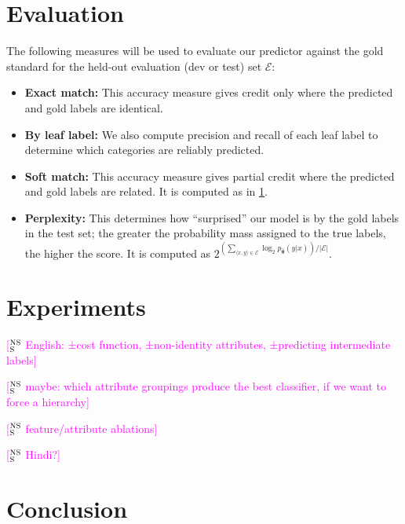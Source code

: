 \documentclass[11pt,letterpaper]{article}
\newcommand{\ensuretext}[1]{#1}
\newcommand{\nssmarker}{\ensuretext{\textcolor{magenta}{\ensuremath{^{\textsc{NS}}_{\textsc{S}}}}}}
\newcommand{\arkcomment}[3]{\ensuretext{\textcolor{#3}{[#1 #2]}}}
\newcommand{\nss}[1]{\arkcomment{\nssmarker}{#1}{magenta}}
\newcommand{\costversion}[1]{}
\begin{document}
\section{Evaluation}\label{sec:eval}

The following measures will be used to evaluate our predictor against the gold standard 
for the held-out evaluation (dev or test) set $\mathcal{E}$:
\begin{itemize}
  \item \textbf{Exact match:} This accuracy measure gives credit only where the predicted and gold labels 
  are identical.\costversion{\nss{} When the model is allowed to predict internal labels, we will report 
  overall precision and recall of leaf labels. Otherwise, we report accuracy.}
  \item \textbf{By leaf label:} We also compute precision and recall of each leaf label 
  to determine which categories are reliably predicted.
  \item \textbf{Soft match:} This accuracy measure gives partial credit where the predicted and gold labels 
  are related. It is computed as in \cref{sec:eval}.
  \item \textbf{Perplexity:} This determines how ``surprised'' our model is by the gold labels 
  in the test set; the greater the probability mass assigned to the true labels, 
  the higher the score. 
  It is computed as $2^{\left(\sum_{\langle x, y \rangle \in \mathcal{E}} \log_2 p_{\hat{\boldsymbol{\theta}}}(y | x)\right) / |\mathcal{E}|}$.
\end{itemize}

\section{Experiments}\label{sec:exp}

\nss{English: ±cost function, ±non-identity attributes, ±predicting intermediate labels}

\nss{maybe: which attribute groupings produce the best classifier, if we want to force a hierarchy}

\nss{feature/attribute ablations}

\nss{Hindi?}

\section{Conclusion}\label{sec:conclusion}






\setlength{\bibsep}{10pt}
{\fontsize{10}{12.25}\selectfont
}
\end{document}
